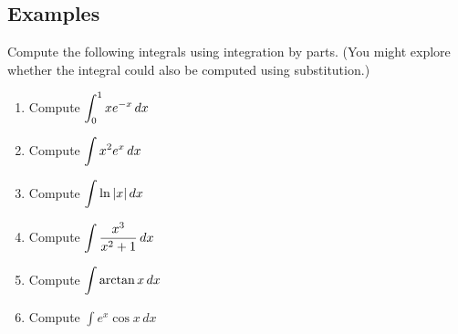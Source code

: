 \documentclass[11pt]{article}
\theoremstyle{definition}
\theoremstyle{named}
\numberwithin{myalgctr}{section}
\begin{document}
\subsection*{Examples}
Compute the following integrals using integration by parts. (You might explore whether the integral could also be computed using substitution.)
\begin{enumerate}
  \item Compute $\displaystyle\int_0^1 xe^{-x}\, dx$
  \item Compute $\displaystyle\int x^2e^x\, dx$
  \item Compute $\displaystyle\int \ln \vert x\vert\, dx$
  \item Compute $\displaystyle\int \frac{x^3}{x^2+1}\, dx$
  \item Compute $\displaystyle\int \arctan x\, dx$
  \item Compute $\int e^x\cos x\, dx$
\end{enumerate}
\end{document}
